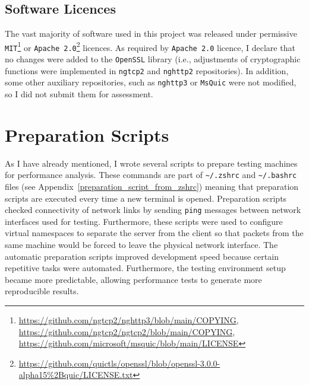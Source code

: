 \documentclass[12pt,a4paper,twoside,openright]{report}
\newcommand\note[2]{{\color{#1}\bf #2}}
\newcommand\simon[1]{\ifcomments{\note{cyan}{SM: #1}}\fi}
\begin{document}
\subsection{Software Licences} 
The vast majority of software used in this project was released under permissive \texttt{MIT}\footnote{\url{https://github.com/ngtcp2/nghttp3/blob/main/COPYING}, \\  \url{https://github.com/ngtcp2/ngtcp2/blob/main/COPYING}, \\
\url{https://github.com/microsoft/msquic/blob/main/LICENSE}} or \texttt{Apache 2.0}\footnote{\url{https://github.com/quictls/openssl/blob/openssl-3.0.0-alpha15\%2Bquic/LICENSE.txt}} licences.
As required by \texttt{Apache 2.0} licence, I declare that no changes were added to the \texttt{OpenSSL} library (i.e., adjustments of cryptographic functions were implemented in \texttt{ngtcp2} and \texttt{nghttp2} repositories).
In addition, some other auxiliary repositories, such as \texttt{nghttp3} or \texttt{MsQuic} were not modified, so I did not submit them for assessment.
























\section{Preparation Scripts}
As I have already mentioned, I wrote several scripts to prepare testing machines for performance analysis.
These commands are part of \texttt{\textasciitilde/.zshrc} and \texttt{\textasciitilde/.bashrc} files (see Appendix~\ref{preparation_script_from_zshrc}) meaning that preparation scripts are executed every time a new terminal is opened.
Preparation scripts checked connectivity of network links by sending \texttt{ping} messages between network interfaces used for testing.
Furthermore, these scripts were used to configure virtual namespaces to separate the server from the client so that packets from the same machine would be forced to leave the physical network interface.
The automatic preparation scripts improved development speed because certain repetitive tasks were automated.
Furthermore, the testing environment setup became more predictable, allowing performance tests to generate more reproducible results.
\end{document}
